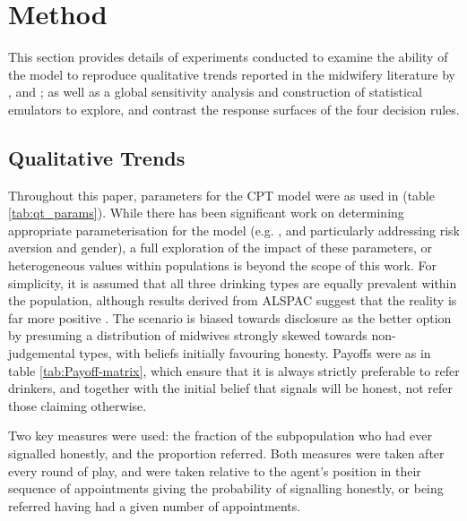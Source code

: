 \section{Method}
\label{sec:method}

This section provides details of experiments conducted to examine the ability of the model to reproduce qualitative trends reported in the midwifery literature by \cite{Alvik2006}, and \cite{Phillips2007}; as well as a global sensitivity analysis and construction of statistical emulators to explore, and contrast the response surfaces of the four decision rules.

\subsection{Qualitative Trends}
\label{sub:qt}


Throughout this paper, parameters for the \ac{CPT} model were as used in \cite{Tversky1992} (table \ref{tab:qt_params}). While there has been significant work on determining appropriate parameterisation for the model (e.g. \cite{Neilson2002,Glockner2012,Nilsson2011}, and particularly \citet{Byrnes1999,Booij2009} addressing risk aversion and gender), a full exploration of the impact of these parameters, or heterogeneous values within populations is beyond the scope of this work. For simplicity, it is assumed that all three drinking types are equally prevalent within the population, although results derived from \ac{ALSPAC} suggest that the reality is far more positive \citep{Humphriss2013}. The scenario is biased towards disclosure as the better option by presuming a distribution of midwives strongly skewed towards non-judgemental types, with beliefs initially favouring honesty. Payoffs were as in table \ref{tab:Payoff-matrix}, which ensure that it is always strictly preferable to refer drinkers, and together with the initial belief that signals will be honest, not refer those claiming otherwise.

Two key measures were used: the fraction of the subpopulation who had ever signalled honestly, and the proportion referred. Both measures were taken after every round of play, and were taken relative to the agent's position in their sequence of appointments giving the probability of signalling honestly, or being referred having had a given number of appointments.

